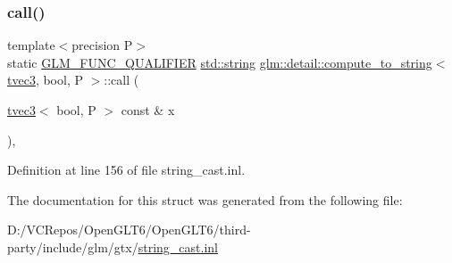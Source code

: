 \subsubsection{\texorpdfstring{call()}{call()}}
{\footnotesize\ttfamily template$<$precision P$>$ \\
static \mbox{\hyperlink{setup_8hpp_a33fdea6f91c5f834105f7415e2a64407}{G\+L\+M\+\_\+\+F\+U\+N\+C\+\_\+\+Q\+U\+A\+L\+I\+F\+I\+ER}} \mbox{\hyperlink{glad_8h_ac83513893df92266f79a515488701770}{std\+::string}} \mbox{\hyperlink{structglm_1_1detail_1_1compute__to__string}{glm\+::detail\+::compute\+\_\+to\+\_\+string}}$<$ \mbox{\hyperlink{structglm_1_1tvec3}{tvec3}}, bool, P $>$\+::call (\begin{DoxyParamCaption}\item[{\mbox{\hyperlink{structglm_1_1tvec3}{tvec3}}$<$ bool, P $>$ const \&}]{x }\end{DoxyParamCaption})\hspace{0.3cm}{\ttfamily [inline]}, {\ttfamily [static]}}



Definition at line 156 of file string\+\_\+cast.\+inl.



The documentation for this struct was generated from the following file\+:\begin{DoxyCompactItemize}
\item 
D\+:/\+V\+C\+Repos/\+Open\+G\+L\+T6/\+Open\+G\+L\+T6/third-\/party/include/glm/gtx/\mbox{\hyperlink{string__cast_8inl}{string\+\_\+cast.\+inl}}\end{DoxyCompactItemize}
